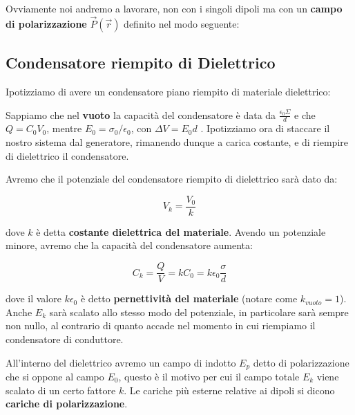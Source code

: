 Ovviamente noi andremo a lavorare, non con i singoli dipoli ma con un \textbf{campo di polarizzazione} $\vec{P}(\vec{r})$ definito nel modo seguente: 

\subsection{Condensatore riempito di Dielettrico}
Ipotizziamo di avere un condensatore piano riempito di materiale dielettrico: 

\begin{figure} [H]
	\centering
\end{figure}

Sappiamo che nel \textbf{vuoto} la capacità del condensatore è data da $\frac{\epsilon_0 \Sigma}{d}$ e che $Q = C_0 V_0$, mentre $E_0 = \sigma_0 / \epsilon_0$, con $\Delta V = E_0 d$ .
Ipotizziamo ora di staccare il nostro sistema dal generatore, rimanendo dunque a carica costante, e di riempire di dielettrico il condensatore. 

Avremo che il potenziale del condensatore riempito di dielettrico sarà dato da: 

$$ 
V_k = \frac{V_0}{k}
$$

dove $k$ è detta \textbf{costante dielettrica del materiale}. Avendo un potenziale minore, avremo che la capacità del condensatore aumenta: 

$$
C_k = \frac{Q}{V} = kC_0 = k\epsilon_0 \frac{\sigma}{d}
$$

dove il valore $k\epsilon_0$ è detto \textbf{pernettività del materiale} (notare come $k_{vuoto} = 1$). Anche $E_k $ sarà scalato allo stesso modo del potenziale, in particolare sarà sempre non nullo, al contrario di quanto accade nel momento in cui riempiamo il condensatore di conduttore.

All'interno del dielettrico avremo un campo di indotto $E_p$ detto di polarizzazione che si oppone al campo $E_0$, questo è il motivo per cui il campo totale $E_k$ viene scalato di un certo fattore $k$. 
Le cariche più esterne relative ai dipoli si dicono \textbf{cariche di polarizzazione}.

